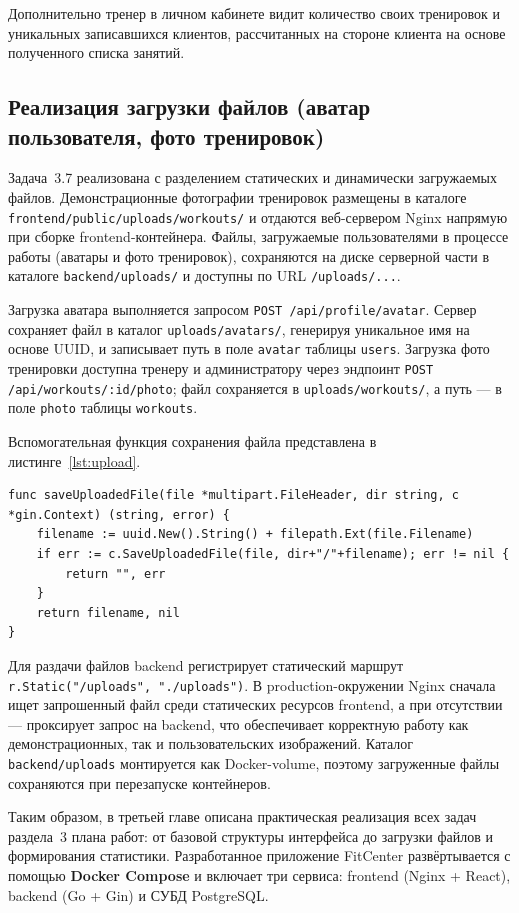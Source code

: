 Дополнительно тренер в личном кабинете видит количество своих тренировок
и уникальных записавшихся клиентов, рассчитанных на стороне клиента на основе
полученного списка занятий.

\subsection{Реализация загрузки файлов (аватар пользователя, фото тренировок)}

Задача~3.7 реализована с разделением статических и динамически загружаемых
файлов. Демонстрационные фотографии тренировок размещены в каталоге
\texttt{frontend/public/uploads/workouts/} и отдаются веб-сервером Nginx
напрямую при сборке frontend-контейнера. Файлы, загружаемые пользователями
в процессе работы (аватары и фото тренировок), сохраняются на диске серверной
части в каталоге \texttt{backend/uploads/} и доступны по URL \texttt{/uploads/...}.

Загрузка аватара выполняется запросом \texttt{POST /api/profile/avatar}.
Сервер сохраняет файл в каталог \texttt{uploads/avatars/}, генерируя уникальное
имя на основе UUID, и записывает путь в поле \texttt{avatar} таблицы
\texttt{users}. Загрузка фото тренировки доступна тренеру и администратору
через эндпоинт \texttt{POST /api/workouts/:id/photo}; файл сохраняется
в \texttt{uploads/workouts/}, а путь --- в поле \texttt{photo} таблицы
\texttt{workouts}.

Вспомогательная функция сохранения файла представлена в листинге~\ref{lst:upload}.

\begin{lstlisting}[caption={Сохранение загруженного файла (upload.go, стр.~11--17)}, label={lst:upload}]
func saveUploadedFile(file *multipart.FileHeader, dir string, c *gin.Context) (string, error) {
	filename := uuid.New().String() + filepath.Ext(file.Filename)
	if err := c.SaveUploadedFile(file, dir+"/"+filename); err != nil {
		return "", err
	}
	return filename, nil
}
\end{lstlisting}

Для раздачи файлов backend регистрирует статический маршрут
\texttt{r.Static("/uploads", "./uploads")}. В production-окружении Nginx
сначала ищет запрошенный файл среди статических ресурсов frontend, а при
отсутствии --- проксирует запрос на backend, что обеспечивает корректную
работу как демонстрационных, так и пользовательских изображений. Каталог
\texttt{backend/uploads} монтируется как Docker-volume, поэтому загруженные
файлы сохраняются при перезапуске контейнеров.

Таким образом, в третьей главе описана практическая реализация всех задач
раздела~3 плана работ: от базовой структуры интерфейса до загрузки файлов
и формирования статистики. Разработанное приложение FitCenter развёртывается
с помощью \textbf{Docker Compose} и включает три сервиса: frontend (Nginx +
React), backend (Go + Gin) и СУБД PostgreSQL.
